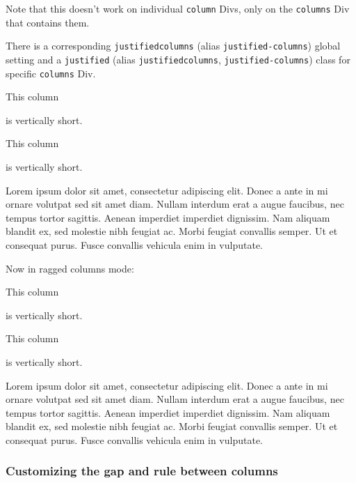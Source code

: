 \documentclass[
]{article}
\begin{document}
Note that this doesn't work on individual \texttt{column} Divs, only on
the \texttt{columns} Div that contains them.

There is a corresponding \texttt{justifiedcolumns} (alias
\texttt{justified-columns}) global setting and a \texttt{justified}
(alias \texttt{justifiedcolumns}, \texttt{justified-columns}) class for
specific \texttt{columns} Div.

{\begin{multicols}{3}

This column

is vertically short.

\columnbreak

This column

is vertically short.

\columnbreak

Lorem ipsum dolor sit amet, consectetur adipiscing elit. Donec a ante in
mi ornare volutpat sed sit amet diam. Nullam interdum erat a augue
faucibus, nec tempus tortor sagittis. Aenean imperdiet imperdiet
dignissim. Nam aliquam blandit ex, sed molestie nibh feugiat ac. Morbi
feugiat convallis semper. Ut et consequat purus. Fusce convallis
vehicula enim in vulputate.

\end{multicols}
}

Now in ragged columns mode:

{\raggedcolumns\begin{multicols}{3}

This column

is vertically short.

\columnbreak

This column

is vertically short.

\columnbreak

Lorem ipsum dolor sit amet, consectetur adipiscing elit. Donec a ante in
mi ornare volutpat sed sit amet diam. Nullam interdum erat a augue
faucibus, nec tempus tortor sagittis. Aenean imperdiet imperdiet
dignissim. Nam aliquam blandit ex, sed molestie nibh feugiat ac. Morbi
feugiat convallis semper. Ut et consequat purus. Fusce convallis
vehicula enim in vulputate.

\end{multicols}
}

\hypertarget{customizing-the-gap-and-rule-between-columns}{%
\subsubsection{Customizing the gap and rule between
columns}\label{customizing-the-gap-and-rule-between-columns}}
\end{document}
